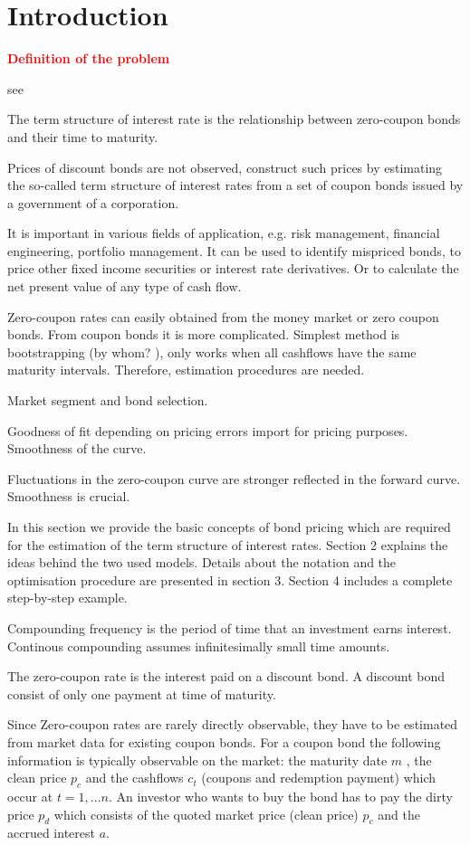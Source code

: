 \newpage
\section{Introduction}

\textcolor{red}{\textbf{Definition of the problem}}

see \cite{Lin2002, Zangari1997}

The term structure of interest rate is the relationship between zero-coupon bonds and their time to maturity.

Prices of discount bonds are not observed, construct such prices by estimating the so-called term structure of interest rates from a set of coupon bonds issued by a government of a corporation.

It is important in various fields of application, e.g. risk management, financial engineering, portfolio management. It can be used to identify mispriced bonds, to price other fixed income securities or interest rate derivatives. Or to calculate the net present value of any type of cash flow. 

Zero-coupon rates can easily obtained from the money market or zero coupon bonds. From coupon bonds it is more complicated. Simplest method is bootstrapping (by whom? \cite{Hagan2006}), only works when all cashflows have the same maturity intervals. Therefore, estimation procedures are needed.

Market segment and bond selection.

Goodness of fit depending on pricing errors import for pricing purposes. Smoothness of the curve.

Fluctuations in the zero-coupon curve are stronger reflected in the forward curve. Smoothness is crucial.

In this section we provide the basic concepts of bond pricing which are required for the estimation of the term structure of interest rates. Section 2 explains the ideas behind the two used models. Details about the notation and the optimisation procedure are presented in section 3. Section 4 includes a complete step-by-step example.


Compounding frequency is the period of time that an investment earns interest. Continous compounding assumes infinitesimally small time amounts.

The zero-coupon rate is the interest paid on a discount bond. A discount bond consist of only one payment at time of maturity.

Since Zero-coupon rates are rarely directly observable, they have to be estimated from market data for existing coupon bonds. For a coupon bond the following information is typically observable on the market: the maturity date $m$ , the clean price $p_c$ and the cashflows $c_t$ (coupons and redemption payment) which occur at $t=1,...n$. An investor who wants to buy the bond has to pay the dirty price $p_d$ which consists of the quoted market price (clean price) $p_c$ and the accrued interest $a$.

